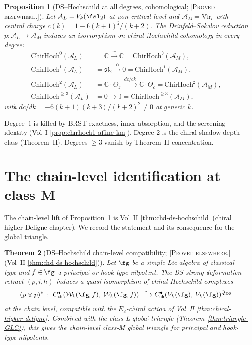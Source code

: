 \documentclass[11pt]{amsart}
\newtheorem{theorem}{Theorem}[section]
\newtheorem{proposition}[theorem]{Proposition}
\theoremstyle{definition}
\theoremstyle{remark}
\providecommand{\ChirHoch}{\mathrm{ChirHoch}}
\providecommand{\cA}{\mathcal{A}}
\providecommand{\cW}{\mathcal{W}}
\providecommand{\ClaimStatusProvedElsewhere}{\textsc{[Proved elsewhere.]}}
\begin{document}
\begin{proposition}[DS--Hochschild at all degrees, cohomological;
\ClaimStatusProvedElsewhere]%
\label{prop:DS-Hochschild-cohom}%
Let $\cA_L = V_k(\fsl_2)$ at non-critical level and
$\cA_M = \mathrm{Vir}_c$ with central charge
$c(k) = 1 - 6(k+1)^2/(k+2)$. The Drinfeld--Sokolov reduction
$p\colon \cA_L \to \cA_M$ induces an isomorphism on chiral
Hochschild cohomology in every degree:
\begin{align*}
  \ChirHoch^0(\cA_L) &= \mathbb{C}
    \xrightarrow{\;\sim\;} \mathbb{C} = \ChirHoch^0(\cA_M), \\
  \ChirHoch^1(\cA_L) &= \mathfrak{sl}_2
    \xrightarrow{\;0\;} 0 = \ChirHoch^1(\cA_M), \\
  \ChirHoch^2(\cA_L) &= \mathbb{C} \cdot \Theta_k
    \xrightarrow{\;dc/dk\;} \mathbb{C} \cdot \Theta_c
    = \ChirHoch^2(\cA_M), \\
  \ChirHoch^{\ge 3}(\cA_L) &= 0 \to 0 = \ChirHoch^{\ge 3}(\cA_M),
\end{align*}
with $dc/dk = -6(k+1)(k+3)/(k+2)^2 \neq 0$ at generic $k$.
\end{proposition}

Degree~$1$ is killed by BRST exactness, inner absorption, and the
screening identity (Vol~I \ref*{prop:chirhoch1-affine-km}). Degree
$2$ is the chiral shadow depth class (Theorem~H). Degrees
$\ge 3$ vanish by Theorem~H concentration.

\section{The chain-level identification at class M}
\label{sec:class-M-chain-level-closure}

The chain-level lift of Proposition~\ref{prop:DS-Hochschild-cohom}
is Vol~II \ref*{thm:chd-ds-hochschild} (chiral higher Deligne
chapter). We record the statement and its consequence for the
global triangle.

\begin{theorem}[DS--Hochschild chain-level compatibility;
\ClaimStatusProvedElsewhere (Vol~II \ref*{thm:chd-ds-hochschild})]%
\label{thm:DS-Hochschild-chain-level}%
Let $\fg$ be a simple Lie algebra of classical type and
$f \in \fg$ a principal or hook-type nilpotent. The DS strong
deformation retract $(p, i, h)$ induces a quasi-isomorphism of
chiral Hochschild complexes
\[
  (p \otimes p)^* \;:\;
  C^\bullet_{\mathrm{ch}}(\cW_k(\fg, f),\; \cW_k(\fg, f))
  \xrightarrow{\;\sim\;}
  C^\bullet_{\mathrm{ch}}(V_k(\fg),\; V_k(\fg))^{Q_{\mathrm{DS}}}
\]
at the chain level, compatible with the $E_3$-chiral action of
Vol~II \ref*{thm:chiral-higher-deligne}. Combined with the
class-L global triangle (Theorem~\ref{thm:triangle-GLC}), this gives
the chain-level class-M global triangle for principal and hook-type
nilpotents.
\end{theorem}
\end{document}
